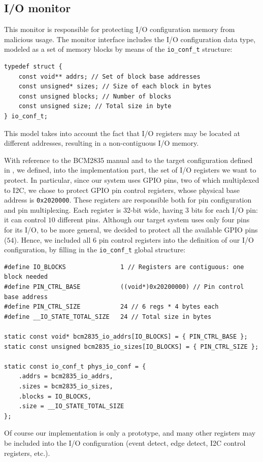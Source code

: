 \subsection{I/O monitor}
\label{sec:io-impl}

This monitor is responsible for protecting I/O configuration memory from malicious usage.
The monitor interface includes the I/O configuration data type, modeled as a set of memory blocks by means of the \verb|io_conf_t| structure:
\begin{lstlisting}
typedef struct {
	const void** addrs; // Set of block base addresses
	const unsigned* sizes; // Size of each block in bytes
	const unsigned blocks; // Number of blocks
	const unsigned size; // Total size in byte
} io_conf_t;
\end{lstlisting}
This model takes into account the fact that I/O registers may be located at different addresses, resulting in a non-contiguous I/O memory.

With reference to the BCM2835 manual \cite{bcm2835} and to the target configuration defined in ,
we defined, into the implementation part, the set of I/O registers we want to protect.
In particular, since our system uses GPIO pins, two of which multiplexed to I2C, we chose to protect GPIO pin control registers, whose physical base address is \verb|0x2020000|.
These registers are responsible both for pin configuration and pin multiplexing. Each register is 32-bit wide, having 3 bits for each I/O pin: it can control $10$ different pins.
Although our target system uses only four pins for its I/O, to be more general, we decided to protect all the available GPIO pins ($54$).
Hence, we included all $6$ pin control registers into the definition of our I/O configuration, by filling in the \verb|io_conf_t| global structure:
\begin{lstlisting}
#define IO_BLOCKS            	1 // Registers are contiguous: one block needed
#define PIN_CTRL_BASE        	((void*)0x20200000) // Pin control base address
#define PIN_CTRL_SIZE        	24 // 6 regs * 4 bytes each
#define __IO_STATE_TOTAL_SIZE	24 // Total size in bytes

static const void* bcm2835_io_addrs[IO_BLOCKS] = { PIN_CTRL_BASE };
static const unsigned bcm2835_io_sizes[IO_BLOCKS] = { PIN_CTRL_SIZE };

static const io_conf_t phys_io_conf = {
	.addrs = bcm2835_io_addrs,
	.sizes = bcm2835_io_sizes,
	.blocks = IO_BLOCKS,
	.size = __IO_STATE_TOTAL_SIZE
};
\end{lstlisting}
Of course our implementation is only a prototype, and many other registers may be included into the I/O configuration (\eg event detect, edge detect, I2C control registers, etc.).

